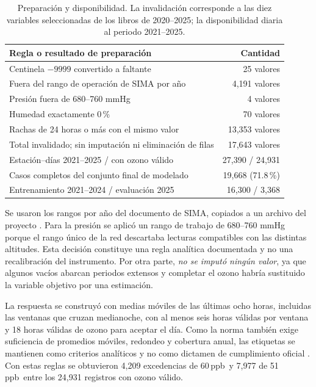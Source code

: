 \documentclass[11pt,letterpaper]{article}
\newcommand{\ppb}{\,ppb}
\begin{document}
\begin{table}[!htbp]\centering\small
\begin{tabular}{@{}P{10.9cm}r@{}}\toprule
Regla o resultado de preparación & Cantidad\\\midrule
Centinela $-9999$ convertido a faltante & 25 valores\\
Fuera del rango de operación de SIMA por año & 4,191 valores\\
Presión fuera de 680--760 mmHg & 4 valores\\
Humedad exactamente 0\,\% & 70 valores\\
Rachas de 24 horas o más con el mismo valor & 13,353 valores\\\midrule
Total invalidado; sin imputación ni eliminación de filas & 17,643 valores\\
Estación--días 2021--2025 / con ozono válido & 27,390 / 24,931\\
Casos completos del conjunto final de modelado & 19,668 (71.8\,\%)\\
Entrenamiento 2021--2024 / evaluación 2025 & 16,300 / 3,368\\\bottomrule
\end{tabular}
\caption{Preparación y disponibilidad. La invalidación corresponde a las diez variables seleccionadas de los libros de 2020--2025; la disponibilidad diaria al periodo 2021--2025.}\label{tab:preparacion}
\end{table}

Se usaron los rangos por año del documento de SIMA, copiados a un archivo del proyecto \citep{simarangos}. Para la presión se aplicó un rango de trabajo de 680--760 mmHg porque el rango único de la red descartaba lecturas compatibles con las distintas altitudes. Esta decisión constituye una regla analítica documentada y no una recalibración del instrumento. Por otra parte, \emph{no se imputó ningún valor}, ya que algunos vacíos abarcan periodos extensos y completar el ozono habría sustituido la variable objetivo por una estimación.

La respuesta se construyó con medias móviles de las últimas ocho horas, incluidas las ventanas que cruzan medianoche, con al menos seis horas válidas por ventana y 18 horas válidas de ozono para aceptar el día. Como la norma también exige suficiencia de promedios móviles, redondeo y cobertura anual, las etiquetas se mantienen como criterios analíticos y no como dictamen de cumplimiento oficial \citep{salud2021}. Con estas reglas se obtuvieron 4,209 excedencias de 60\ppb\ y 7,977 de 51\ppb\ entre los 24,931 registros con ozono válido.
\end{document}
